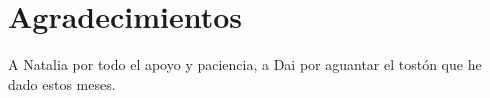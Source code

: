 
\chapter*{Agradecimientos}

A Natalia por todo el apoyo y paciencia, a Dai por aguantar el tostón que he dado estos meses.











